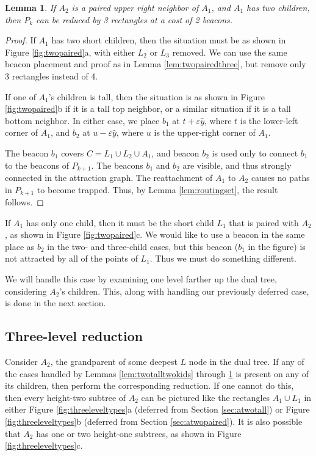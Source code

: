 \documentclass{article}
\newtheorem{lemma}{Lemma}
\begin{document}
		\begin{lemma}\label{lem:twopairedtwo}
			If $A_2$ is a paired upper right neighbor of $A_1$, and $A_1$ has two
			children, then $P_k$ can be reduced by 3 rectangles at a cost of 2 beacons.
		\end{lemma}
		\begin{proof}
			If $A_1$ has two short children, then the situation must be
			as shown in Figure \ref{fig:twopaired}a, with either $L_2$ or $L_3$
			removed.  We can use the same beacon placement and proof as in Lemma
			\ref{lem:twopairedthree}, but remove only 3 rectangles instead of 4.
			
			If one of $A_1$'s children is tall, then the situation is as shown
			in Figure \ref{fig:twopaired}b if it is a tall top neighbor, or a similar
			situation if it is a tall bottom neighbor.  In either case, we 
			place $b_1$ at $t + \varepsilon\hat{y}$, where $t$ is
			the lower-left corner of $A_1$, and $b_2$ at $u - \varepsilon\hat{y}$,
			where $u$ is the upper-right corner of $A_1$.
	
			The beacon $b_1$ covers $C = L_1 \cup L_2 \cup A_1$, and 
			beacon $b_2$ is used only to connect $b_1$ to the beacons of $P_{k+1}$.
			The beacons $b_1$ and $b_2$ are visible, and thus strongly connected in the
			attraction graph.  
			The reattachment of $A_1$ to $A_2$ causes no paths in $P_{k+1}$ to become
			trapped. Thus, by Lemma \ref{lem:routingset}, the result follows.
		\end{proof} 
		
		If $A_1$ has only one child, then it must be the short child $L_1$ that is
		paired with $A_2$, as shown in Figure \ref{fig:twopaired}c.  We would like
		to use a beacon in the same place as $b_2$ in the two- and three-child cases,
		but this beacon ($b_1$ in the figure) is not attracted by all of the points of
		$L_1$.  Thus we must do something different.
		
		We will handle this case by examining one level farther up the dual tree,
		considering $A_2$'s children.  This, along with handling our previously
		deferred case, is done in the next section.

	\subsection{Three-level reduction}\label{sec:deferred}

		Consider $A_2$, the grandparent of some deepest $L$ node in the dual tree.
		If any of the cases handled by Lemmas \ref{lem:twotalltwokids} through
		\ref{lem:twopairedtwo} is present on any of its children, then perform the
		corresponding reduction.
		If one cannot do this, then every height-two subtree of $A_2$ can be pictured
		like the rectangles $A_1 \cup L_1$ in
		either Figure \ref{fig:threeleveltypes}a 
		(deferred from Section \ref{sec:atwotall})
		or Figure \ref{fig:threeleveltypes}b
		(deferred from Section \ref{sec:atwopaired}).
		It is also possible that $A_2$ has one or two height-one subtrees, as shown in
		Figure \ref{fig:threeleveltypes}c.
				
\end{document}
